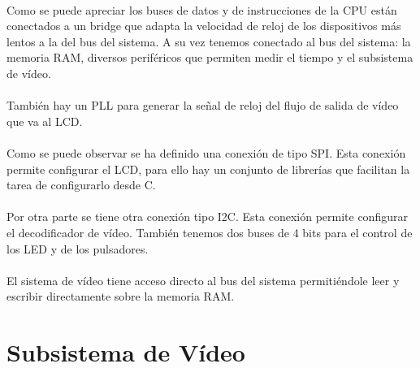 \documentclass[a4paper,12pt,titlepage,final]{book}
\begin{document}
\paragraph{}
Como se puede apreciar los buses de datos y de instrucciones de la CPU están conectados a un bridge que adapta la velocidad de reloj de los dispositivos más lentos a la del bus del sistema. A su vez tenemos conectado al bus del sistema: la memoria RAM, diversos periféricos que permiten medir el tiempo y el subsistema de vídeo.

\paragraph{}
También hay un PLL para generar la señal de reloj del flujo de salida de vídeo que va al LCD.

\paragraph{}
Como se puede observar se ha definido una conexión de tipo SPI. Esta conexión permite configurar el LCD, para ello hay un conjunto de librerías que facilitan la tarea de configurarlo desde C. 

\paragraph{}
Por otra parte se tiene otra conexión tipo I2C. Esta conexión permite configurar el  decodificador de vídeo. También tenemos dos buses de 4 bits para el control de los LED y de los pulsadores.

\paragraph{}
El sistema de vídeo tiene acceso directo al bus del sistema permitiéndole leer y escribir directamente sobre la memoria RAM.

\section{Subsistema de Vídeo}
\subsection*{}
\subsubsection*{}
\end{document}
